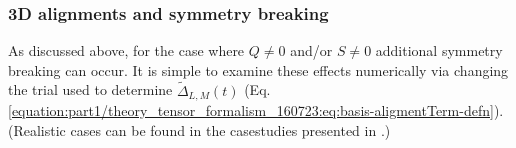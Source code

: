 \documentclass[letterpaper,table,10pt,english]{jupyterBook}
\begin{document}
\subsubsection{3D alignments and symmetry breaking}
\label{\detokenize{part1/theory_tensor_formalism_160723:d-alignments-and-symmetry-breaking}}\label{\detokenize{part1/theory_tensor_formalism_160723:sec-theory-af-alignment-term-3d}}
\sphinxAtStartPar
As discussed above, for the case where \(Q\neq0\) and/or \(S\neq0\) additional symmetry breaking can occur. It is simple to examine these effects numerically via changing the trial {\hyperref[\detokenize{backmatter/glossary:term-ADMs}]{}} used to determine \(\tilde{\Delta}_{L,M}(t)\) (Eq. \eqref{equation:part1/theory_tensor_formalism_160723:eq:basis-aligmentTerm-defn}). (Realistic cases can be found in the case\sphinxhyphen{}studies presented in {\hyperref[\detokenize{part2/extracting_matrix_elements_overview_270423:chpt-extracting-matrix-elements-overview}]{}}.)
\end{document}
